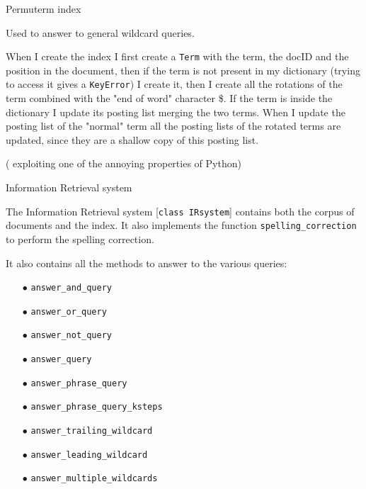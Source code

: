 \documentclass[10pt, aspectratio=169, compress, protectframetitle, handout]{beamer}
\begin{document}
\begin{frame}{Permuterm index}

    Used to answer to \alert{general wildcard queries}.

    When I create the index I first create a \texttt{Term} with the term, the docID and the position in the document, then if the term is not present in my dictionary (trying to access it gives a \texttt{KeyError}) I create it, then I create all the rotations of the term combined with the "end of word" character \$. If the term is inside the dictionary I update its posting list merging the two terms. When I update the posting list of the "normal" term all the posting lists of the rotated terms are updated, since they are a shallow copy of this posting list.
    
    {(\color{green}\Checkedbox} exploiting one of the annoying properties of Python)

\end{frame}

\begin{frame}{Information Retrieval system}

    The Information Retrieval system [\texttt{\alert{class IRsystem}}] contains both the corpus of documents and the index. It also implements the function \texttt{spelling\_correction} to perform the spelling correction.
    
    It also contains all the methods to answer to the various queries:
    \begin{itemize}
        \item[\alert{$\bullet$}] \texttt{answer\_and\_query}
        \item[\alert{$\bullet$}] \texttt{answer\_or\_query}
        \item[\alert{$\bullet$}] \texttt{answer\_not\_query}
        \item[\alert{$\bullet$}] \texttt{answer\_query}
        \item[\alert{$\bullet$}] \texttt{answer\_phrase\_query}
        \item[\alert{$\bullet$}] \texttt{answer\_phrase\_query\_ksteps}
        \item[\alert{$\bullet$}] \texttt{answer\_trailing\_wildcard}
        \item[\alert{$\bullet$}] \texttt{answer\_leading\_wildcard}
        \item[\alert{$\bullet$}] \texttt{answer\_multiple\_wildcards}
    \end{itemize}
\end{frame}
\end{document}
